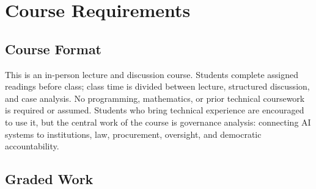 \documentclass[12pt]{article}
\begin{document}
\section*{Course Requirements}

\subsection*{Course Format}
This is an in-person lecture and discussion course. Students complete assigned readings before class; class time is divided between lecture, structured discussion, and case analysis. No programming, mathematics, or prior technical coursework is required or assumed. Students who bring technical experience are encouraged to use it, but the central work of the course is governance analysis: connecting AI systems to institutions, law, procurement, oversight, and democratic accountability.

\subsection*{Graded Work}
\end{document}
